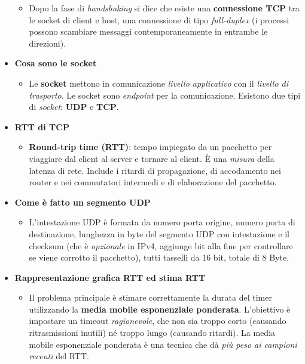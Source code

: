 \begin{itemize}
\begin{itemize}
            \item  Dopo la fase di \textit{handshaking} si dice che esiste una \textbf{connessione TCP} tra le socket di client e host, una connessione di tipo \textit{full-duplex} (i processi possono scambiare messaggi contemporaneamente in entrambe le direzioni).
        \end{itemize}
    \item \textbf{Cosa sono le socket}
        \begin{itemize}
            \item Le \textbf{socket} mettono in comunicazione \textit{livello applicativo} con il \textit{livello di trasporto}. Le socket sono \textit{endpoint} per la comunicazione. Esistono due tipi di \textit{socket}: \textbf{UDP} e \textbf{TCP}.
        \end{itemize}
    \item \textbf{RTT di TCP}
        \begin{itemize}
            \item \textbf{Round-trip time (RTT)}: tempo impiegato da un pacchetto per viaggiare dal client al server e tornare al client. È una \textit{misura} della latenza di rete. Include i ritardi di propagazione, di accodamento nei router e nei commutatori intermedi e di elaborazione del pacchetto.
        \end{itemize}
    \item \textbf{Come è fatto un segmento UDP}
        \begin{itemize}
            \item L'intestazione UDP è formata da numero porta origine, numero porta di destinazione, lunghezza in byte del segmento UDP con intestazione e il checksum (che è \textit{opzionale} in IPv4, aggiunge bit alla fine per controllare se viene corrotto il pacchetto), tutti tasselli da 16 bit, totale di 8 Byte.
        \end{itemize}
    \item \textbf{Rappresentazione grafica RTT ed stima RTT}
        \begin{itemize}
            \item Il problema principale è stimare correttamente la durata del timer utilizzando la \textbf{media mobile esponenziale ponderata}. L'obiettivo è impostare un timeout \textit{ragionevole}, che non sia troppo corto (causando ritrasmissioni inutili) né troppo lungo (causando ritardi). La media mobile esponenziale ponderata è una tecnica che dà \textit{più peso ai campioni recenti} del RTT.
        \end{itemize}

\end{itemize}
